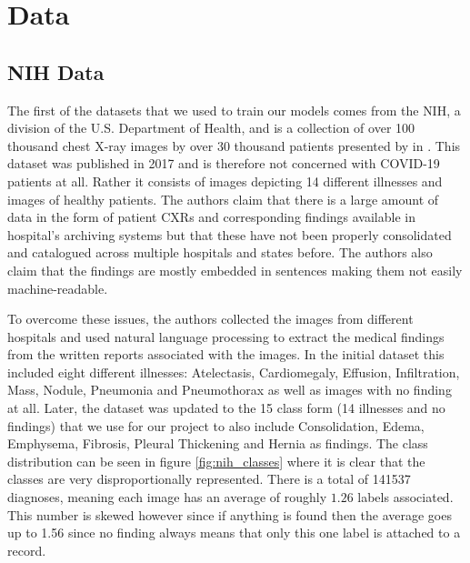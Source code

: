 \chapter{Data}\label{chapter:data}

\section{NIH Data}\label{data:nih}

The first of the datasets that we used to train our models comes from the \acf{NIH}, a division of the U.S. Department of Health, and is a collection of over 100 thousand chest X-ray images by over 30 thousand patients presented by \citeauthor{wang_chestx-ray8_2017} in \autocite{wang_chestx-ray8_2017}. This dataset was published in 2017 and is therefore not concerned with COVID-19 patients at all. Rather it consists of images depicting 14 different illnesses and images of healthy patients. The authors claim that there is a large amount of data in the form of patient \acp{CXR} and corresponding findings available in hospital's archiving systems but that these have not been properly consolidated and catalogued across multiple hospitals and states before. The authors also claim that the findings are mostly embedded in sentences making them not easily machine-readable.

To overcome these issues, the authors collected the images from different hospitals and used natural language processing to extract the medical findings from the written reports associated with the images. In the initial dataset this included eight different illnesses: Atelectasis, Cardiomegaly, Effusion, Infiltration, Mass, Nodule, Pneumonia and Pneumothorax as well as images with no finding at all. Later, the dataset was updated to the 15 class form (14 illnesses and no findings) that we use for our project to also include Consolidation, Edema, Emphysema, Fibrosis, Pleural Thickening and Hernia as findings. The class distribution can be seen in figure \vref{fig:nih_classes} where it is clear that the classes are very disproportionally represented. There is a total of \num{141537} diagnoses, meaning each image has an average of roughly $1.26$ labels associated. This number is skewed however since if anything is found then the average goes up to \num{1.56} since no finding always means that only this one label is attached to a record.

